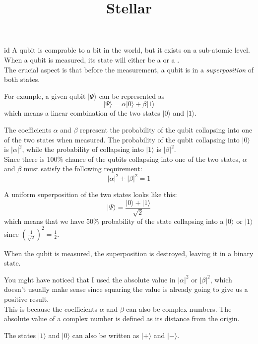 \documentclass[preview]{standalone}
\begin{document}
\title{Stellar}
\genpage

\begin{snippet}{id}
    A qubit is comprable to a bit in the  world, but it exists on a sub-atomic level. \\
    When a qubit is measured, its state will either be a  or a . \\
    The crucial aspect is that before the measurement, a qubit is in a \textit{superposition} of both states.
    
    For example, a given qubit \(|\Psi\rangle\) can be represented as
    \[
        |\Psi\rangle=\alpha |0\rangle+\beta |1\rangle
    \]
    which means a linear combination of the two states \(|0\rangle\) and \(|1\rangle\).
    
    The coefficients \(\alpha\) and \(\beta\) represent the probability of the qubit collapsing into one of the two states when measured.
    The probability of the qubit collapsing into \(|0\rangle\) is \(|\alpha|^2\),
    while the probability of collapsing into \(|1\rangle\) is \(|\beta|^2\). \\
    Since there is \(100\%\) chance of the qubits collapsing into one of the two states, \(\alpha\) and \(\beta\) must satisfy the following requirement:
    \[
        |\alpha|^2+|\beta|^2=1
    \]
    
    A uniform superposition of the two states looks like this:
    \[
        |\Psi\rangle=\frac{|0\rangle+|1\rangle}{\sqrt{2}}
    \]
    which means that we have \(50\%\) probability of the state collapsing into a \(|0\rangle\) or \(|1\rangle\)
    since \({\left(\frac{1}{\sqrt{2}}\right)}^2=\frac{1}{2}\).
    
    When the qubit is measured, the superposition is destroyed, leaving it in a  binary state.
    
    You mght have noticed that I used the absolute value in \(|\alpha|^2\) or \(|\beta|^2\), which doesn't usually make sense since squaring the value is already going to give us a positive result.
    \\
    This is because the coefficients \(\alpha\) and \(\beta\) can also be complex numbers. The absolute value of a complex number is defined as its distance from the origin.
    
    The states \(|1\rangle\) and \(|0\rangle\) can also be written as \(|+\rangle\) and \(|-\rangle\).
\end{snippet}
\end{document}
